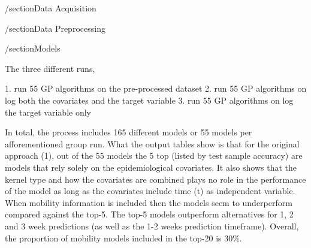 /section{Data Acquisition}


/section{Data Preprocessing}


/section{Models}


The three different runs, 

1. run 55 GP algorithms on the pre-processed dataset
2. run 55 GP algorithms on log both the covariates and the target variable
3. run 55 GP algorithms on log the target variable only

In total, the process includes 165 different models or 55 models per afforementioned group run. What the output tables show is that for the original approach (1), out of the 55 models the 5 top (listed by test sample accuracy) are models that rely solely on the epidemiological covariates. It also shows that the kernel type and how the covariates are combined plays no role in the performance of the model as long as the covariates include time (t) as independent variable. When mobility information is included then the models seem to underperform compared against the top-5. The top-5 models outperform alternatives for 1, 2 and 3 week predictions (as well as the 1-2 weeks prediction timeframe). Overall, the proportion of mobility models included in the top-20 is 30\%.  
